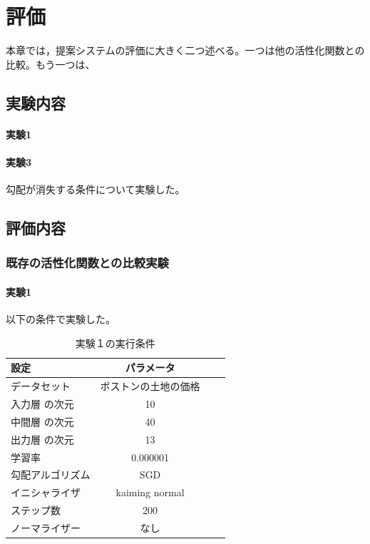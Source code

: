 \chapter{評価}
\label{evaluation}
本章では，提案システムの評価に大きく二つ述べる。一つは他の活性化関数との比較。もう一つは、

\section{実験内容}
\subsubsection{実験1}

\subsubsection{実験3}
勾配が消失する条件について実験した。




\section{評価内容}



\subsection{既存の活性化関数との比較実験}



\subsubsection{実験1}

以下の条件で実験した。

\begin{table}[htbp]
    \begin{center}
        \caption{実験１の実行条件}
        \vspace{5mm} 
        \begin{tabular}{l*{2}{c}r}
        設定              & パラメータ \\
        \hline
        データセット            & ボストンの土地の価格 \\
        入力層 の次元            & 10 \\
        中間層 の次元            & 40 \\
        出力層 の次元            & 13 \\
        学習率              & 0.000001 \\
        勾配アルゴリズム       & SGD \\
        イニシャライザ               & kaiming normal \\
        ステップ数        & 200 \\
        ノーマライザー           & なし \\
        \end{tabular}
    \end{center}
\end{table}


